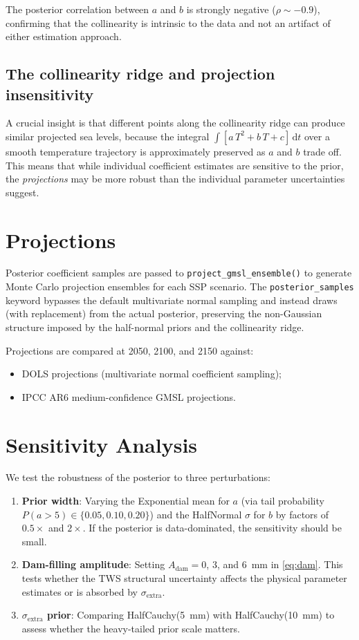 \documentclass[11pt]{article}
\newcommand{\sigextra}{\sigma_{\text{extra}}}
\begin{document}
The posterior correlation between $a$ and $b$ is strongly negative ($\rho \sim -0.9$), confirming that the collinearity is intrinsic to the data and not an artifact of either estimation approach.

\subsection{The collinearity ridge and projection insensitivity}

A crucial insight is that different points along the collinearity ridge can produce similar projected sea levels, because the integral $\int [a\,T^2 + b\,T + c]\,\mathrm{d}t$ over a smooth temperature trajectory is approximately preserved as $a$ and $b$ trade off.  This means that while individual coefficient estimates are sensitive to the prior, the \emph{projections} may be more robust than the individual parameter uncertainties suggest.


\section{Projections}

Posterior coefficient samples are passed to \texttt{project\_gmsl\_ensemble()} to generate Monte Carlo projection ensembles for each SSP scenario.  The \texttt{posterior\_samples} keyword bypasses the default multivariate normal sampling and instead draws (with replacement) from the actual posterior, preserving the non-Gaussian structure imposed by the half-normal priors and the collinearity ridge.

Projections are compared at 2050, 2100, and 2150 against:
\begin{itemize}
  \item DOLS projections (multivariate normal coefficient sampling);
  \item IPCC AR6 medium-confidence GMSL projections.
\end{itemize}


\section{Sensitivity Analysis}

We test the robustness of the posterior to three perturbations:

\begin{enumerate}
  \item \textbf{Prior width}: Varying the Exponential mean for $a$ (via tail probability $P(a > 5) \in \{0.05, 0.10, 0.20\}$) and the HalfNormal $\sigma$ for $b$ by factors of $0.5\times$ and $2\times$.  If the posterior is data-dominated, the sensitivity should be small.

  \item \textbf{Dam-filling amplitude}: Setting $A_{\text{dam}} = 0$, 3, and 6~mm in \cref{eq:dam}.  This tests whether the TWS structural uncertainty affects the physical parameter estimates or is absorbed by $\sigextra$.

  \item \textbf{$\sigextra$ prior}: Comparing HalfCauchy(5~mm) with HalfCauchy(10~mm) to assess whether the heavy-tailed prior scale matters.
\end{enumerate}
\end{document}
